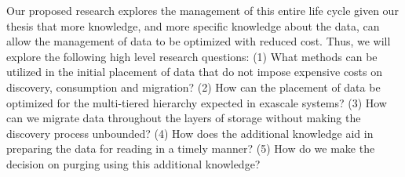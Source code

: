 
Our proposed research explores the management of this entire life cycle
given our thesis that more knowledge, and more specific knowledge about the
data, can allow the management of data to be optimized with reduced cost.
Thus, we will explore the following high level research questions: (1) What methods can
be utilized in the initial placement of data that do not impose expensive
costs on discovery, consumption and migration? (2) How can the placement of
data be optimized for the multi-tiered hierarchy expected in exascale
systems? (3) How can we migrate data throughout the layers of storage
without making the discovery process unbounded? (4) How does the additional
knowledge aid in preparing the data for reading in a timely manner? (5) How
do we make the decision on purging using this additional knowledge? 







